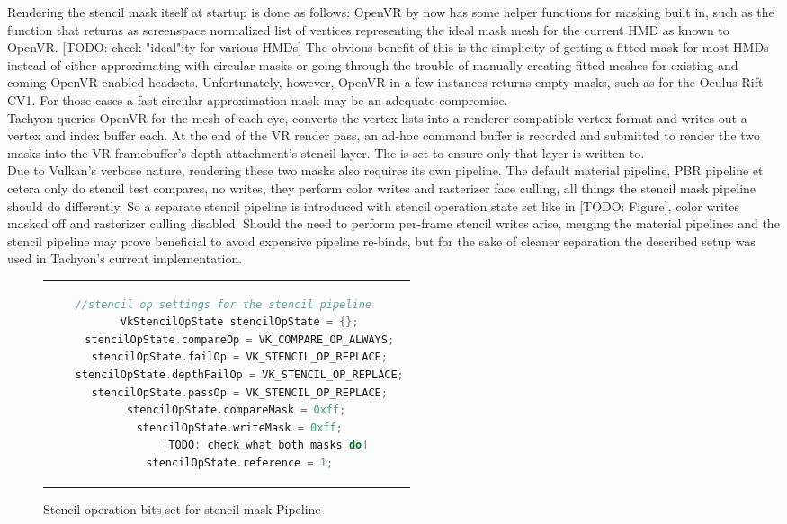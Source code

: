 Rendering the stencil mask itself at startup is done as follows: 
OpenVR by now has some helper functions for masking built in, such as the  function that returns as screenspace normalized list of vertices representing the ideal mask mesh for the current HMD as known to OpenVR. [TODO: check "ideal"ity for various HMDs] The obvious benefit of this is the simplicity of getting a fitted mask for most HMDs instead of either approximating with circular masks or going through the trouble of manually creating fitted meshes for existing and coming OpenVR-enabled headsets. Unfortunately, however, OpenVR in a few instances returns empty masks, such as for the Oculus Rift CV1. For those cases a fast circular approximation mask may be an adequate compromise. \\
Tachyon queries OpenVR for the mesh of each eye, converts the vertex lists into a renderer-compatible vertex format and writes out a vertex and index buffer each. 
At the end of the VR render pass, an ad-hoc command buffer is recorded and submitted to render the two masks into the VR framebuffer's depth attachment's stencil layer. The  is set to ensure only that layer is written to. \\

Due to Vulkan's verbose nature, rendering these two masks also requires its own pipeline. The default material pipeline, PBR pipeline et cetera only do stencil test compares, no writes, they perform color writes and rasterizer face culling, all things the stencil mask pipeline should do differently. So a separate stencil pipeline is introduced with stencil operation state set like in [TODO: Figure], color writes masked off and rasterizer culling disabled. Should the need to perform per-frame stencil writes arise, merging the material pipelines and the stencil pipeline may prove beneficial to avoid expensive pipeline re-binds, but for the sake of cleaner separation the described setup was used in Tachyon's current implementation. 

\begin{figure}[htpb]
  \centering
  \begin{tabular}{c}
  \begin{lstlisting}[language=C++]
//stencil op settings for the stencil pipeline 
	VkStencilOpState stencilOpState = {};
	stencilOpState.compareOp = VK_COMPARE_OP_ALWAYS;
	stencilOpState.failOp = VK_STENCIL_OP_REPLACE;
	stencilOpState.depthFailOp = VK_STENCIL_OP_REPLACE;
	stencilOpState.passOp = VK_STENCIL_OP_REPLACE;
	stencilOpState.compareMask = 0xff; 
	stencilOpState.writeMask = 0xff;
			[TODO: check what both masks do]
	stencilOpState.reference = 1;
		\end{lstlisting}
  \end{tabular}
  \caption[Stencil pipeline stencil operation bits]{Stencil operation bits set for stencil mask Pipeline}\label{fig:lst_StencilOpState_StencilPipeline}
\end{figure}
